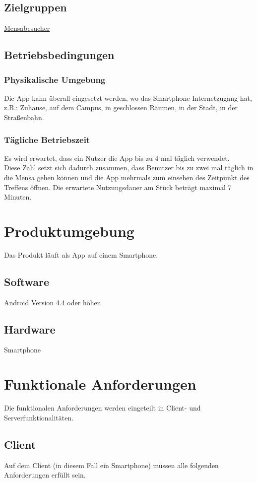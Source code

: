 \documentclass[a4paper]{scrreprt}
\begin{document}
\section{Zielgruppen}
\hyperlink{label1}{Mensabesucher}
 
\section{Betriebsbedingungen}
\subsection{Physikalische Umgebung}
Die App kann überall eingesetzt werden, wo das Smartphone Internetzugang hat,
z.B.: Zuhause, auf dem Campus, in geschlossen Räumen, in der Stadt, in der Straßenbahn.

\subsection{Tägliche Betriebszeit}
Es wird erwartet, dass ein Nutzer die App bis zu 4 mal täglich verwendet. \\
Diese Zahl setzt sich dadurch zusammen, dass Benutzer bis zu zwei mal täglich in die Mensa gehen können und die App mehrmals zum einsehen des Zeitpunkt des Treffens öffnen. Die erwartete Nutzungsdauer am Stück beträgt maximal 7 Minuten.
 
\chapter{Produktumgebung}
Das Produkt läuft als App auf einem Smartphone.

\section{Software}
Android Version 4.4 oder höher.
 
\section{Hardware}
Smartphone 
 
\chapter{Funktionale Anforderungen}
Die funktionalen Anforderungen werden eingeteilt in Client- und Serverfunktionalitäten.

\section{Client}
Auf dem Client (in diesem Fall ein Smartphone) müssen alle folgenden Anforderungen erfüllt sein. 
\end{document}
